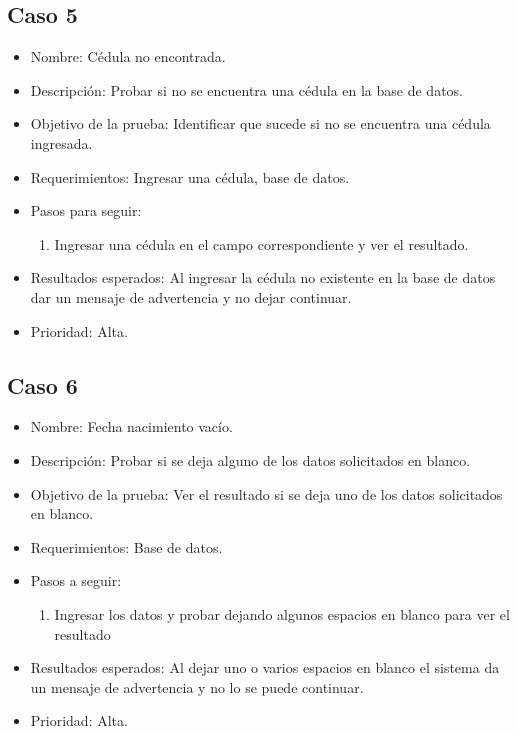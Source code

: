 \documentclass[conference]{IEEEtran}
\begin{document}
\subsection{Caso 5}
\begin{itemize}
\item Nombre: Cédula no encontrada.
\item Descripción: Probar si no se encuentra una cédula en la base de datos.
\item Objetivo de la prueba: Identificar que sucede si no se encuentra una cédula ingresada.
\item Requerimientos: Ingresar una cédula, base de datos. 
\item Pasos para seguir: 
\begin{enumerate}
\item Ingresar una cédula en el campo correspondiente y ver el resultado. 
\end{enumerate}
\item Resultados esperados: Al ingresar la cédula no existente en la base de datos dar un mensaje de advertencia y no dejar continuar. 
\item Prioridad: Alta.

\end{itemize}

\subsection{Caso 6}
\begin{itemize}
\item Nombre: Fecha nacimiento vacío. 
\item Descripción: Probar si se deja alguno de los datos solicitados en blanco.
\item Objetivo de la prueba: Ver el resultado si se deja uno de los datos solicitados en blanco. 
\item Requerimientos: Base de datos. 
\item Pasos a seguir:
\begin{enumerate}
\item Ingresar los datos y probar dejando algunos espacios en blanco para ver el resultado
\end{enumerate}
\item Resultados esperados: Al dejar uno o varios espacios en blanco el sistema da un mensaje de advertencia y no lo se puede continuar.
\item Prioridad: Alta.
\end{itemize}
\end{document}
